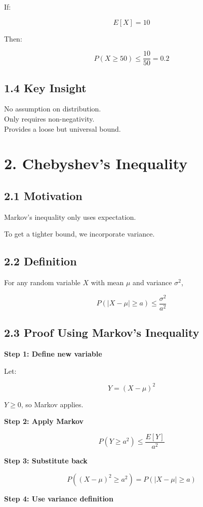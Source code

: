 \documentclass[12pt]{article}
\begin{document}
If:

\[
E[X] = 10
\]

Then:

\[
P (X \ge 50) \le \frac{10}{50} = 0.2
\]

\subsection*{1.4 Key Insight}

No assumption on distribution.\\
Only requires non-negativity.\\
Provides a loose but universal bound.

\section*{2. Chebyshev’s Inequality}

\subsection*{2.1 Motivation}

Markov’s inequality only uses expectation.

To get a tighter bound, we incorporate variance.

\subsection*{2.2 Definition}

For any random variable $X$ with mean $\mu$ and variance $\sigma^2$,

\[
P (|X - \mu| \ge a) \le \frac{\sigma^2}{a^2}
\]

\subsection*{2.3 Proof Using Markov’s Inequality}

\textbf{Step 1: Define new variable}

Let:

\[
Y = (X - \mu)^2
\]

$Y \ge 0$, so Markov applies.

\textbf{Step 2: Apply Markov}

\[
P (Y \ge a^2) \le \frac{E[Y]}{a^2}
\]

\textbf{Step 3: Substitute back}

\[
P ((X - \mu)^2 \ge a^2) = P (|X - \mu| \ge a)
\]

\textbf{Step 4: Use variance definition}
\end{document}
